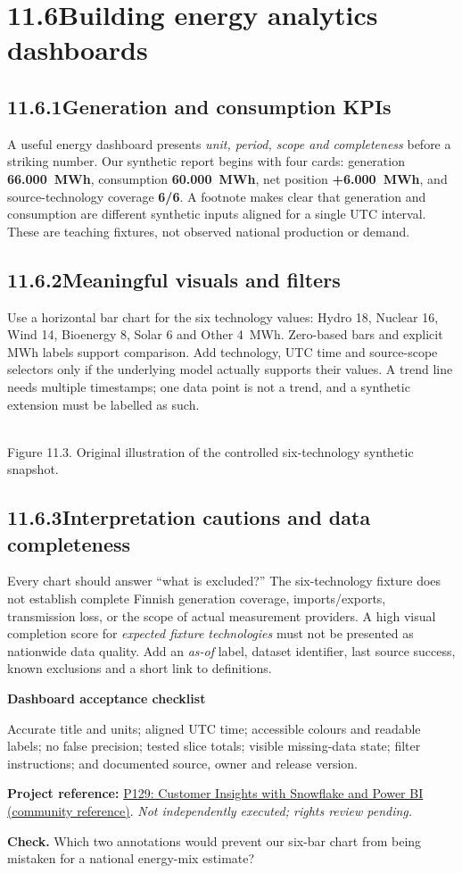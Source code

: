 \documentclass[11pt,twoside]{article}
\newcommand{\topic}[2]{\subsection*{#1\quad #2}}
\newcommand{\repo}[2]{\par\begingroup\fontsize{8.0}{9.6}\selectfont\sffamily\color{inkgray}\textbf{Project reference:} \href{#2}{#1}. \textit{Not independently executed; rights review pending.}\par\endgroup}
\begin{document}
\section*{11.6\quad Building energy analytics dashboards}
\topic{11.6.1}{Generation and consumption KPIs}
A useful energy dashboard presents \emph{unit, period, scope and completeness} before a striking number. Our synthetic report begins with four cards: generation \textbf{66.000~MWh}, consumption \textbf{60.000~MWh}, net position \textbf{+6.000~MWh}, and source-technology coverage \textbf{6/6}. A footnote makes clear that generation and consumption are different synthetic inputs aligned for a single UTC interval. These are teaching fixtures, not observed national production or demand.
\topic{11.6.2}{Meaningful visuals and filters}
Use a horizontal bar chart for the six technology values: Hydro 18, Nuclear 16, Wind 14, Bioenergy 8, Solar 6 and Other 4~MWh. Zero-based bars and explicit MWh labels support comparison. Add technology, UTC time and source-scope selectors only if the underlying model actually supports their values. A trend line needs multiple timestamps; one data point is not a trend, and a synthetic extension must be labelled as such.
\begin{center}\\{\fontsize{8}{9}\selectfont\color{inkgray}Figure 11.3. Original illustration of the controlled six-technology synthetic snapshot.}\end{center}
\topic{11.6.3}{Interpretation cautions and data completeness}
Every chart should answer ``what is excluded?'' The six-technology fixture does not establish complete Finnish generation coverage, imports/exports, transmission loss, or the scope of actual measurement providers. A high visual completion score for \emph{expected fixture technologies} must not be presented as nationwide data quality. Add an \emph{as-of} label, dataset identifier, last source success, known exclusions and a short link to definitions.
\begin{whitebox}\textbf{Dashboard acceptance checklist}\par
Accurate title and units; aligned UTC time; accessible colours and readable labels; no false precision; tested slice totals; visible missing-data state; filter instructions; and documented source, owner and release version.\end{whitebox}
\repo{P129: Customer Insights with Snowflake and Power BI (community reference)}{https://github.com/BalajiKottana/Customer_Insights_with_Snowflake_and_PowerBI}
\textbf{Check.} Which two annotations would prevent our six-bar chart from being mistaken for a national energy-mix estimate?
\newpage
\end{document}

